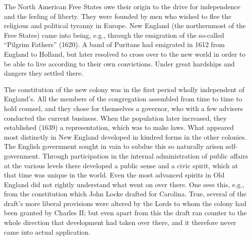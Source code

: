 \documentclass[12pt,a4paper,openany]{book}
\newcommand{\opage}[1]{\marginnote{\footnotesize\textit{[#1]}}}
\begin{document}
The North American Free States owe their origin to
the drive for independence and the feeling of liberty. They were founded by
men who wished to flee the religious and political tyranny
in Europe. New England (the northernmost of the Free States)
came into being, e.g., through the emigration of the so-called ``Pilgrim Fathers''
\opage{117}(1620). A band of Puritans had emigrated in 1612 from England
to Holland, but later resolved to cross over to the new
world in order to be able to live according to their own convictions.
Under great hardships and dangers they settled there.

The constitution of the new colony was in the first period wholly
independent of England's. All the members of the congregation assembled
from time to time to hold counsel, and they chose for themselves
a governor, who with a few advisers conducted the current
business. When the population later increased, they established
(1639) a representation, which was to make laws. What
appeared most distinctly in New England developed in
kindred forms in the other colonies. The English government
sought in vain to subdue this so naturally arisen
self-government. Through participation in the internal administration of
public affairs at the various levels there developed
a public sense and a civic spirit, which at that time was
unique in the world. Even the most advanced spirits in
Old England did not rightly understand what went on over
there. One sees this, e.g., from the constitution which John
Locke drafted for Carolina. True, several of the draft's
more liberal provisions were altered by the Lords to whom
the colony had been granted by Charles II; but even apart from this
the draft ran counter to the whole direction that development had
taken over there, and it therefore never came into actual application.
\end{document}
